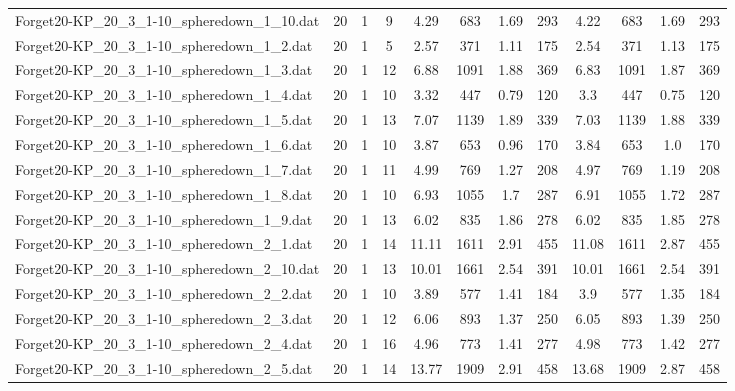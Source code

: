 \begin{sidewaystable}[!ht]
{\begin{tabular}{lccccccccccc}
Forget20-KP\_20\_3\_1-10\_spheredown\_1\_10.dat & 20 & 1 & 9 & 4.29 & 683 &  \textcolor{blue2}{1.69} & 293 & 4.22 & 683 &  \textcolor{blue2}{1.69} & 293 \\
Forget20-KP\_20\_3\_1-10\_spheredown\_1\_2.dat & 20 & 1 & 5 & 2.57 & 371 &  \textcolor{blue2}{1.11} & 175 & 2.54 & 371 & 1.13 & 175 \\
Forget20-KP\_20\_3\_1-10\_spheredown\_1\_3.dat & 20 & 1 & 12 & 6.88 & 1091 & 1.88 & 369 & 6.83 & 1091 &  \textcolor{blue2}{1.87} & 369 \\
Forget20-KP\_20\_3\_1-10\_spheredown\_1\_4.dat & 20 & 1 & 10 & 3.32 & 447 & 0.79 & 120 & 3.3 & 447 & 0.75 & 120 \\
Forget20-KP\_20\_3\_1-10\_spheredown\_1\_5.dat & 20 & 1 & 13 & 7.07 & 1139 & 1.89 & 339 & 7.03 & 1139 &  \textcolor{blue2}{1.88} & 339 \\
Forget20-KP\_20\_3\_1-10\_spheredown\_1\_6.dat & 20 & 1 & 10 & 3.87 & 653 &  \textcolor{blue2}{0.96} & 170 & 3.84 & 653 & 1.0 & 170 \\
Forget20-KP\_20\_3\_1-10\_spheredown\_1\_7.dat & 20 & 1 & 11 & 4.99 & 769 & 1.27 & 208 & 4.97 & 769 &  \textcolor{blue2}{1.19} & 208 \\
Forget20-KP\_20\_3\_1-10\_spheredown\_1\_8.dat & 20 & 1 & 10 & 6.93 & 1055 &  \textcolor{blue2}{1.7} & 287 & 6.91 & 1055 & 1.72 & 287 \\
Forget20-KP\_20\_3\_1-10\_spheredown\_1\_9.dat & 20 & 1 & 13 & 6.02 & 835 & 1.86 & 278 & 6.02 & 835 &  \textcolor{blue2}{1.85} & 278 \\
Forget20-KP\_20\_3\_1-10\_spheredown\_2\_1.dat & 20 & 1 & 14 & 11.11 & 1611 & 2.91 & 455 & 11.08 & 1611 &  \textcolor{blue2}{2.87} & 455 \\
Forget20-KP\_20\_3\_1-10\_spheredown\_2\_10.dat & 20 & 1 & 13 & 10.01 & 1661 &  \textcolor{blue2}{2.54} & 391 & 10.01 & 1661 &  \textcolor{blue2}{2.54} & 391 \\
Forget20-KP\_20\_3\_1-10\_spheredown\_2\_2.dat & 20 & 1 & 10 & 3.89 & 577 & 1.41 & 184 & 3.9 & 577 &  \textcolor{blue2}{1.35} & 184 \\
Forget20-KP\_20\_3\_1-10\_spheredown\_2\_3.dat & 20 & 1 & 12 & 6.06 & 893 & 1.37 & 250 & 6.05 & 893 & 1.39 & 250 \\
Forget20-KP\_20\_3\_1-10\_spheredown\_2\_4.dat & 20 & 1 & 16 & 4.96 & 773 & 1.41 & 277 & 4.98 & 773 & 1.42 & 277 \\
Forget20-KP\_20\_3\_1-10\_spheredown\_2\_5.dat & 20 & 1 & 14 & 13.77 & 1909 & 2.91 & 458 & 13.68 & 1909 &  \textcolor{blue2}{2.87} & 458 \\

\end{tabular}}
\end{sidewaystable}

